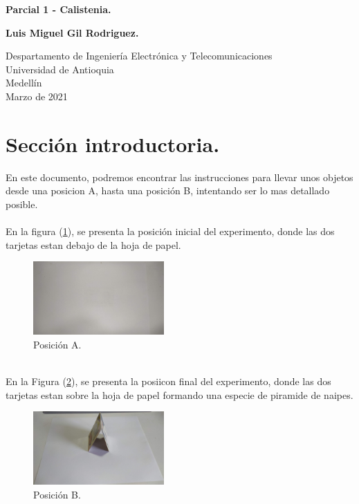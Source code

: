 \documentclass{article}
\begin{document}
\begin{titlepage}
    \begin{center}
        \vspace*{1cm}
            
        \Huge
        \textbf{Parcial 1 - Calistenia.}
            
        \vspace{0.5cm}
        \LARGE
            
        \vspace{1.5cm}
            
        \textbf{Luis Miguel Gil Rodriguez.}
            
        \vfill
            
        \vspace{0.8cm}
            
        \Large
        Despartamento de Ingeniería Electrónica y Telecomunicaciones\\
        Universidad de Antioquia\\
        Medellín\\
        Marzo de 2021
            
    \end{center}
\end{titlepage}

\tableofcontents
\newpage
\section{Sección introductoria.}\label{intro}
En este documento, podremos encontrar las instrucciones para llevar unos objetos desde una posicion A, hasta una posición B, intentando ser lo mas detallado posible.
\\
\\
En la figura (\ref{fig:pos_a}), se presenta la posición inicial del experimento, donde las dos tarjetas estan debajo de la hoja de papel.
\begin{figure}[h]
\includegraphics[width=5cm]{pos_a.jpg}
\centering
\caption{Posición A.}
\label{fig:pos_a}
\end{figure}
\\
En la Figura (\ref{fig:pos_b}), se presenta la posiicon final del experimento, donde las dos tarjetas estan sobre la hoja de papel formando una especie de piramide de naipes.
\begin{figure}[h]
\includegraphics[width=5cm]{pos_b.jpg}
\centering
\caption{Posición B.}
\label{fig:pos_b}
\end{figure}
\end{document}
